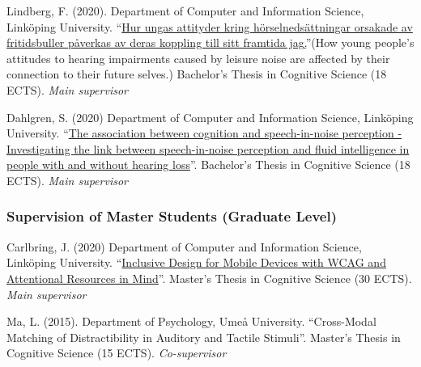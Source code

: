 \documentclass[]{article}
\begin{document}
Lindberg, F. (2020). Department of Computer and Information Science,
Linköping University.
``\href{http://liu.diva-portal.org/smash/record.jsf?dswid=-6296\&faces-redirect=true\&language=en\&searchType=SIMPLE\&query=Marsja\&af=\%5B\%5D\&aq=\%5B\%5B\%5D\%5D\&aq2=\%5B\%5B\%5D\%5D\&aqe=\%5B\%5D\&pid=diva2\%3A1468019\&noOfRows=50\&sortOrder=author_sort_asc\&sortOrder2=title_sort_asc\&onlyFullText=false\&sf=undergraduate}{Hur
ungas attityder kring hörselnedsättningar orsakade av fritidsbuller
påverkas av deras koppling till sitt framtida jag.}''(How young people's
attitudes to hearing impairments caused by leisure noise are affected by
their connection to their future selves.) Bachelor's Thesis in Cognitive
Science (18 ECTS). \emph{Main supervisor}

Dahlgren, S. (2020) Department of Computer and Information Science,
Linköping University.
``\href{http://liu.diva-portal.org/smash/record.jsf?dswid=-6296\&faces-redirect=true\&language=en\&searchType=SIMPLE\&query=Marsja\&af=\%5B\%5D\&aq=\%5B\%5B\%5D\%5D\&aq2=\%5B\%5B\%5D\%5D\&aqe=\%5B\%5D\&pid=diva2\%3A1443600\&noOfRows=50\&sortOrder=author_sort_asc\&sortOrder2=title_sort_asc\&onlyFullText=false\&sf=undergraduate}{The
association between cognition and speech-in-noise perception -
Investigating the link between speech-in-noise perception and fluid
intelligence in people with and without hearing loss}''. Bachelor's
Thesis in Cognitive Science (18 ECTS). \emph{Main supervisor}

\hypertarget{supervision-of-master-students-graduate-level}{%
\subsubsection{Supervision of Master Students (Graduate
Level)}\label{supervision-of-master-students-graduate-level}}

Carlbring, J. (2020) Department of Computer and Information Science,
Linköping University.
``\href{http://liu.diva-portal.org/smash/record.jsf?dswid=-6296\&faces-redirect=true\&language=en\&searchType=SIMPLE\&query=Marsja\&af=\%5B\%5D\&aq=\%5B\%5B\%5D\%5D\&aq2=\%5B\%5B\%5D\%5D\&aqe=\%5B\%5D\&pid=diva2\%3A1441358\&noOfRows=50\&sortOrder=author_sort_asc\&sortOrder2=title_sort_asc\&onlyFullText=false\&sf=undergraduate}{Inclusive
Design for Mobile Devices with WCAG and Attentional Resources in
Mind}''. Master's Thesis in Cognitive Science (30 ECTS). \emph{Main
supervisor}

Ma, L. (2015). Department of Psychology, Umeå University. ``Cross-Modal
Matching of Distractibility in Auditory and Tactile Stimuli''. Master's
Thesis in Cognitive Science (15 ECTS). \emph{Co-supervisor}
\end{document}
